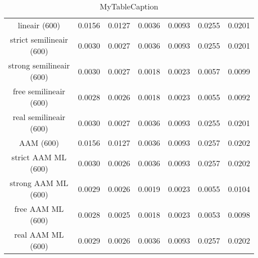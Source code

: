 \begin{table}
\centering
\begin{tabular}{|c|c|c|c|c|c|c|}
\hline
 &  &  &  &  &  &  \\
\hline
lineair (600) & 0.0156 & 0.0127 & 0.0036 & 0.0093 & 0.0255 & 0.0201 \\
\hline
strict semilineair (600) & 0.0030 & 0.0027 & 0.0036 & 0.0093 & 0.0255 & 0.0201 \\
\hline
strong semilineair (600) & 0.0030 & 0.0027 & 0.0018 & 0.0023 & 0.0057 & 0.0099 \\
\hline
free semilineair (600) & 0.0028 & 0.0026 & 0.0018 & 0.0023 & 0.0055 & 0.0092 \\
\hline
real semilineair (600) & 0.0030 & 0.0027 & 0.0036 & 0.0093 & 0.0255 & 0.0201 \\
\hline
AAM (600) & 0.0156 & 0.0127 & 0.0036 & 0.0093 & 0.0257 & 0.0202 \\
\hline
strict AAM ML (600) & 0.0030 & 0.0026 & 0.0036 & 0.0093 & 0.0257 & 0.0202 \\
\hline
strong AAM ML (600) & 0.0029 & 0.0026 & 0.0019 & 0.0023 & 0.0055 & 0.0104 \\
\hline
free AAM ML (600) & 0.0028 & 0.0025 & 0.0018 & 0.0023 & 0.0053 & 0.0098 \\
\hline
real AAM ML (600) & 0.0029 & 0.0026 & 0.0036 & 0.0093 & 0.0257 & 0.0202 \\
\hline
\end{tabular}
\caption{MyTableCaption}
\label{table:MyTableLabel}
\end{table}
